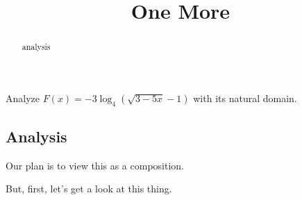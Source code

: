 \documentclass{ximera}
\title{One More}
\begin{document}
\begin{abstract}
analysis
\end{abstract}
\maketitle












Analyze $F(x) = -3 \log_4(\sqrt{3 - 5x} - 1)$ with its natural domain. 




\subsection*{Analysis}





Our plan is to view this as a composition. 



But, first, let's get a look at this thing. 
\end{document}
